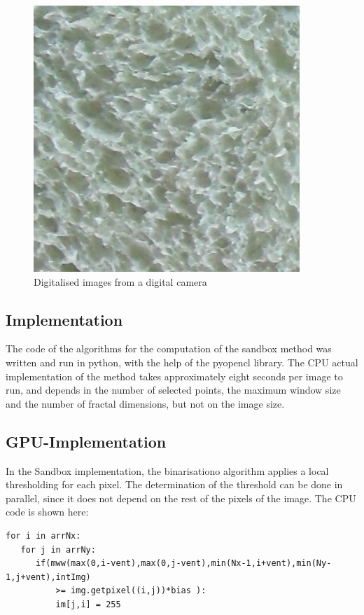 \documentclass[oneside,a4paper,english,links]{article}
\begin{document}
\begin{figure}[htb]
\includegraphics[scale=0.20]{imagenes/Sa14}
\caption{Digitalised images from a digital camera}
\label{fig:camera}
\end{figure}

\subsection{Implementation}

The code of the algorithms for the computation of the sandbox method was written and run in python, with the help of the pyopencl library. The CPU actual implementation of the method takes approximately eight seconds per image to run, and depends in the number of selected points, the maximum window size and the number of fractal dimensions, but not on the image size.

\subsection{GPU-Implementation}
In the Sandbox implementation, the binarisationo algorithm applies a local thresholding for each pixel. The determination of the threshold can be done in parallel, since it does not depend on the rest of the pixels of the image. The CPU code is shown here:

\begin{verbatim}
for i in arrNx:
   for j in arrNy:
      if(mww(max(0,i-vent),max(0,j-vent),min(Nx-1,i+vent),min(Ny-1,j+vent),intImg)
          >= img.getpixel((i,j))*bias ): 
          im[j,i] = 255
\end{verbatim}
\end{document}
